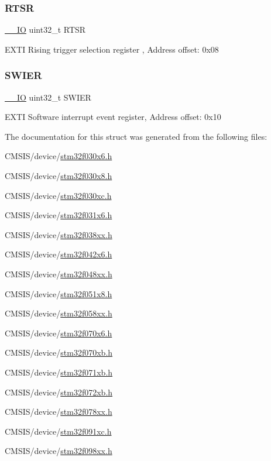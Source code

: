 \subsubsection{\texorpdfstring{R\+T\+SR}{RTSR}}
{\footnotesize\ttfamily \hyperlink{core__sc300_8h_aec43007d9998a0a0e01faede4133d6be}{\+\_\+\+\_\+\+IO} uint32\+\_\+t R\+T\+SR}

E\+X\+TI Rising trigger selection register , Address offset\+: 0x08 \mbox{\label{struct_e_x_t_i___type_def_a9eae93b6cc13d4d25e12f2224e2369c9}} 
\subsubsection{\texorpdfstring{S\+W\+I\+ER}{SWIER}}
{\footnotesize\ttfamily \hyperlink{core__sc300_8h_aec43007d9998a0a0e01faede4133d6be}{\+\_\+\+\_\+\+IO} uint32\+\_\+t S\+W\+I\+ER}

E\+X\+TI Software interrupt event register, Address offset\+: 0x10 

The documentation for this struct was generated from the following files\+:\begin{DoxyCompactItemize}
\item 
C\+M\+S\+I\+S/device/\hyperlink{stm32f030x6_8h}{stm32f030x6.\+h}\item 
C\+M\+S\+I\+S/device/\hyperlink{stm32f030x8_8h}{stm32f030x8.\+h}\item 
C\+M\+S\+I\+S/device/\hyperlink{stm32f030xc_8h}{stm32f030xc.\+h}\item 
C\+M\+S\+I\+S/device/\hyperlink{stm32f031x6_8h}{stm32f031x6.\+h}\item 
C\+M\+S\+I\+S/device/\hyperlink{stm32f038xx_8h}{stm32f038xx.\+h}\item 
C\+M\+S\+I\+S/device/\hyperlink{stm32f042x6_8h}{stm32f042x6.\+h}\item 
C\+M\+S\+I\+S/device/\hyperlink{stm32f048xx_8h}{stm32f048xx.\+h}\item 
C\+M\+S\+I\+S/device/\hyperlink{stm32f051x8_8h}{stm32f051x8.\+h}\item 
C\+M\+S\+I\+S/device/\hyperlink{stm32f058xx_8h}{stm32f058xx.\+h}\item 
C\+M\+S\+I\+S/device/\hyperlink{stm32f070x6_8h}{stm32f070x6.\+h}\item 
C\+M\+S\+I\+S/device/\hyperlink{stm32f070xb_8h}{stm32f070xb.\+h}\item 
C\+M\+S\+I\+S/device/\hyperlink{stm32f071xb_8h}{stm32f071xb.\+h}\item 
C\+M\+S\+I\+S/device/\hyperlink{stm32f072xb_8h}{stm32f072xb.\+h}\item 
C\+M\+S\+I\+S/device/\hyperlink{stm32f078xx_8h}{stm32f078xx.\+h}\item 
C\+M\+S\+I\+S/device/\hyperlink{stm32f091xc_8h}{stm32f091xc.\+h}\item 
C\+M\+S\+I\+S/device/\hyperlink{stm32f098xx_8h}{stm32f098xx.\+h}\end{DoxyCompactItemize}
